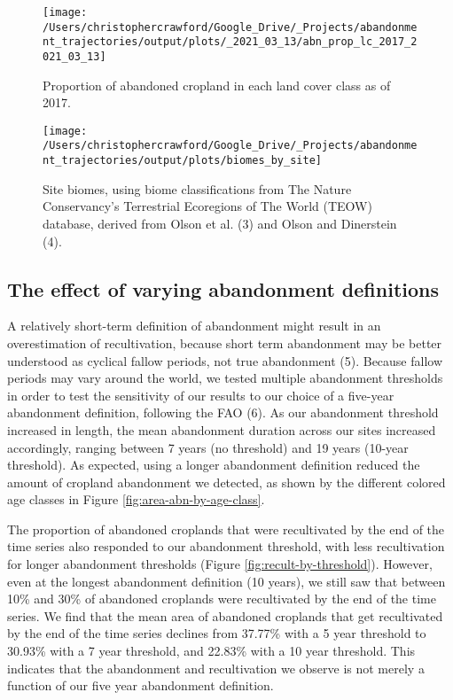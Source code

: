 \documentclass[9pt,twoside,lineno]{pnas-new}
\begin{document}
\begin{figure}
\texttt{[image: /Users/christophercrawford/Google\_Drive/\_Projects/abandonment\_trajectories/output/plots/\_2021\_03\_13/abn\_prop\_lc\_2017\_2021\_03\_13]} \caption{Proportion of abandoned cropland in each land cover class as of 2017.}\label{fig:abn-prop-lc}
\end{figure}



\begin{figure}
\texttt{[image: /Users/christophercrawford/Google\_Drive/\_Projects/abandonment\_trajectories/output/plots/biomes\_by\_site]} \caption{Site biomes, using biome classifications from The Nature Conservancy's Terrestrial Ecoregions of The World (TEOW) database, derived from Olson et al. (3) and Olson and Dinerstein (4).}\label{fig:site-biomes}
\end{figure}

\hypertarget{abn-thresholds}{%
\subsection{The effect of varying abandonment definitions}\label{abn-thresholds}}

A relatively short-term definition of abandonment might result in an overestimation of recultivation, because short term abandonment may be better understood as cyclical fallow periods, not true abandonment (5).
Because fallow periods may vary around the world, we tested multiple abandonment thresholds in order to test the sensitivity of our results to our choice of a five-year abandonment definition, following the FAO (6).
As our abandonment threshold increased in length, the mean abandonment duration across our sites increased accordingly, ranging between 7 years (no threshold) and 19 years (10-year threshold).
As expected, using a longer abandonment definition reduced the amount of cropland abandonment we detected, as shown by the different colored age classes in Figure \ref{fig:area-abn-by-age-class}.

The proportion of abandoned croplands that were recultivated by the end of the time series also responded to our abandonment threshold, with less recultivation for longer abandonment thresholds (Figure \ref{fig:recult-by-threshold}).
However, even at the longest abandonment definition (10 years), we still saw that between 10\% and 30\% of abandoned croplands were recultivated by the end of the time series.
We find that the mean area of abandoned croplands that get recultivated by the end of the time series declines from 37.77\% with a 5 year threshold to 30.93\% with a 7 year threshold, and 22.83\% with a 10 year threshold.
This indicates that the abandonment and recultivation we observe is not merely a function of our five year abandonment definition.
\end{document}
